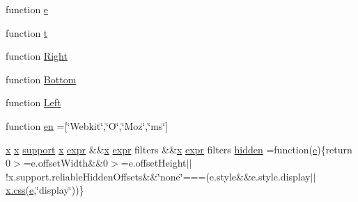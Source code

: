 \begin{DoxyCompactItemize}
\item 
function \hyperlink{_bibabook_2_scripts_2jquery-1_810_82_8min_8js_a2c038346d47955cbe2cb91e338edd7e1}{e}
\item 
function \hyperlink{_bibabook_2_scripts_2jquery-1_810_82_8min_8js_a23c5666e83bbbceee94adcd0851f50c4}{t}
\item 
function \hyperlink{_bibabook_2_scripts_2jquery-1_810_82_8min_8js_ac7f66efc33d974809d85fc5bdb00c6eb}{Right}
\item 
function \hyperlink{_bibabook_2_scripts_2jquery-1_810_82_8min_8js_aff76c1cba4a00c678dfce0e0c5a5538a}{Bottom}
\item 
function \hyperlink{_bibabook_2_scripts_2jquery-1_810_82_8min_8js_abef68bf244a1159a49fe3a2c153a65d2}{Left}
\item 
function \hyperlink{_bibabook_2_scripts_2jquery-1_810_82_8min_8js_a5d7a777130eac935addcf4926a74b23c}{en} =\mbox{[}\char`\"{}Webkit\char`\"{},\char`\"{}O\char`\"{},\char`\"{}Moz\char`\"{},\char`\"{}ms\char`\"{}\mbox{]}
\item 
\hyperlink{packages_2j_query_81_810_82_2_content_2_scripts_2jquery-1_810_82_8min_8js_a5ce50d751c9664d05375c8f5080ed43e}{x} \hyperlink{packages_2j_query_81_810_82_2_content_2_scripts_2jquery-1_810_82_8min_8js_a5ce50d751c9664d05375c8f5080ed43e}{x} \hyperlink{jquery-1_810_82-vsdoc_8js_a1be69652377630fc5432ae5ec6463744}{support} \hyperlink{packages_2j_query_81_810_82_2_content_2_scripts_2jquery-1_810_82_8min_8js_a5ce50d751c9664d05375c8f5080ed43e}{x} \hyperlink{jquery-1_810_82-vsdoc_8js_aaacd1d5b3593ba4dfff6d67d4f6cfda1}{expr} \&\&\hyperlink{packages_2j_query_81_810_82_2_content_2_scripts_2jquery-1_810_82_8min_8js_a5ce50d751c9664d05375c8f5080ed43e}{x} \hyperlink{jquery-1_810_82-vsdoc_8js_aaacd1d5b3593ba4dfff6d67d4f6cfda1}{expr} filters \&\&\hyperlink{packages_2j_query_81_810_82_2_content_2_scripts_2jquery-1_810_82_8min_8js_a5ce50d751c9664d05375c8f5080ed43e}{x} \hyperlink{jquery-1_810_82-vsdoc_8js_aaacd1d5b3593ba4dfff6d67d4f6cfda1}{expr} filters \hyperlink{_bibabook_2_scripts_2jquery-1_810_82_8min_8js_a086b6295ec8d15f090cd7239137a4979}{hidden} =function(\hyperlink{packages_2_respond_81_82_80_2content_2_scripts_2respond_8min_8js_a2c038346d47955cbe2cb91e338edd7e1}{e})\{return 0$>$=e.\+offset\+Width\&\&0$>$=e.\+offset\+Height$\vert$$\vert$!x.\+support.\+reliable\+Hidden\+Offsets\&\&\char`\"{}none\char`\"{}===(e.\+style\&\&e.\+style.\+display$\vert$$\vert$\hyperlink{jquery-1_810_82-vsdoc_8js_aa8c6af259210b33d20642f8ee70cbfa4}{x.\+css}(\hyperlink{packages_2_respond_81_82_80_2content_2_scripts_2respond_8min_8js_a2c038346d47955cbe2cb91e338edd7e1}{e},\char`\"{}display\char`\"{}))\}

\end{DoxyCompactItemize}
